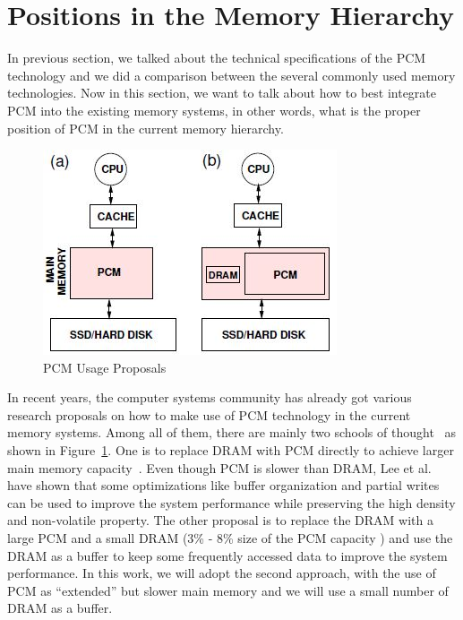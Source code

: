 \section{Positions in the Memory Hierarchy}

In previous section, we talked about the technical specifications of the 
PCM technology and we did a comparison between the several commonly used memory technologies. Now in this section, we want to talk about how to best integrate PCM into the existing memory systems, in other words, what is the proper position of PCM in the current memory hierarchy. 

\begin{figure}[!t]
\centering
\includegraphics[scale=0.9]{figs/pcm-positions.jpg}
\caption{PCM Usage Proposals}
\label{fig:pcm-positions}
\end{figure}

In recent years, the computer systems community has already got various research proposals on how to make use of PCM technology in the current memory systems. Among all of them, 
there are mainly two schools of
thought~\cite{lee2009architecting,qureshi2009scalable,chen2011rethinking} as shown in Figure~\ref{fig:pcm-positions}\cite{chen2011rethinking}.
One is to replace DRAM with PCM directly
to achieve larger main memory capacity~\cite{lee2009architecting}.
Even though PCM is slower than DRAM,
Lee et al.~\cite{lee2009architecting} have shown that some
optimizations like buffer organization and partial writes can be
used to improve the system performance while preserving the
high density and non-volatile property.
The other proposal is
to replace the DRAM with a large PCM and a small
DRAM (3\% - 8\% size of the PCM
capacity \cite{qureshi2009scalable,ramos2011page}) and use
the DRAM as a buffer to keep some frequently
accessed data to improve the system performance.  
In this work, we will adopt the second approach, with the
use of PCM as ``extended'' but slower main memory and we will use a small number of DRAM as a buffer.



